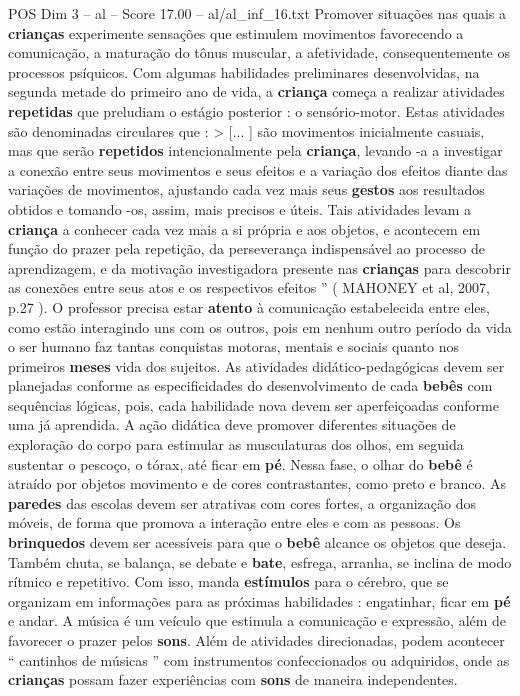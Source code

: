 \begin{textsample}{POS Dim 3 – al – Score 17.00 – al/al\_inf\_16.txt}
Promover situações nas quais a \textbf{crianças} experimente sensações que estimulem movimentos favorecendo a comunicação, a maturação do tônus muscular, a afetividade, consequentemente os processos psíquicos.
Com algumas habilidades preliminares desenvolvidas, na segunda metade do primeiro ano de vida, a \textbf{criança} começa a realizar atividades \textbf{repetidas} que preludiam o estágio posterior : o sensório-motor.
Estas atividades são denominadas circulares que : > [... ] são movimentos inicialmente casuais, mas que serão \textbf{repetidos} intencionalmente pela \textbf{criança}, levando -a a investigar a conexão entre seus movimentos e seus efeitos e a variação dos efeitos diante das variações de movimentos, ajustando cada vez mais seus \textbf{gestos} aos resultados obtidos e tomando -os, assim, mais precisos e úteis.
Tais atividades levam a \textbf{criança} a conhecer cada vez mais a si própria e aos objetos, e acontecem em função do prazer pela repetição, da perseverança indispensável ao processo de aprendizagem, e da motivação investigadora presente nas \textbf{crianças} para descobrir as conexões entre seus atos e os respectivos efeitos ” ( MAHONEY et al, 2007, p.27 ).
O professor precisa estar \textbf{atento} à comunicação estabelecida entre eles, como estão interagindo uns com os outros, pois em nenhum outro período da vida o ser humano faz tantas conquistas motoras, mentais e sociais quanto nos primeiros \textbf{meses} vida dos sujeitos.
As atividades didático-pedagógicas devem ser planejadas conforme as especificidades do desenvolvimento de cada \textbf{bebês} com sequências lógicas, pois, cada habilidade nova devem ser aperfeiçoadas conforme uma já aprendida.
A ação didática deve promover diferentes situações de exploração do corpo para estimular as musculaturas dos olhos, em seguida sustentar o pescoço, o tórax, até ficar em \textbf{pé}.
Nessa fase, o olhar do \textbf{bebê} é atraído por objetos movimento e de cores contrastantes, como preto e branco.
As \textbf{paredes} das escolas devem ser atrativas com cores fortes, a organização dos móveis, de forma que promova a interação entre eles e com as pessoas.
Os \textbf{brinquedos} devem ser acessíveis para que o \textbf{bebê} alcance os objetos que deseja.
Também chuta, se balança, se debate e \textbf{bate}, esfrega, arranha, se inclina de modo rítmico e repetitivo.
Com isso, manda \textbf{estímulos} para o cérebro, que se organizam em informações para as próximas habilidades : engatinhar, ficar em \textbf{pé} e andar.
A música é um veículo que estimula a comunicação e expressão, além de favorecer o prazer pelos \textbf{sons}.
Além de atividades direcionadas, podem acontecer “ cantinhos de músicas ” com instrumentos confeccionados ou adquiridos, onde as \textbf{crianças} possam fazer experiências com \textbf{sons} de maneira independentes.

\end{textsample}

